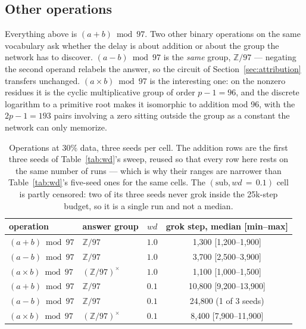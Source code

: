 \documentclass[11pt]{article}
\begin{document}
\subsection{Other operations}
\label{sec:ops}

Everything above is $(a+b) \bmod 97$. Two other binary operations on the same
vocabulary ask whether the delay is about addition or about the group the
network has to discover. $(a-b) \bmod 97$ is the \emph{same} group,
$\mathbb{Z}/97$ --- negating the second operand relabels the answer, so the
circuit of Section~\ref{sec:attribution} transfers unchanged.
$(a \times b) \bmod 97$ is the interesting one: on the nonzero residues it is
the cyclic multiplicative group of order $p - 1 = 96$, and the discrete
logarithm to a primitive root makes it isomorphic to addition mod 96, with the
$2p - 1 = 193$ pairs involving a zero sitting outside the group as a constant
the network can only memorize.

\begin{table}[h]
  \centering
  \caption{Operations at 30\% data, three seeds per cell. The addition rows
  are the first three seeds of Table~\ref{tab:wd}'s sweep, reused so that
  every row here rests on the same number of runs --- which is why their
  ranges are narrower than Table~\ref{tab:wd}'s five-seed ones for the same
  cells. The $(\text{sub}, wd\,{=}\,0.1)$ cell is partly censored: two of its
  three seeds never grok inside the 25k-step budget, so it is a single run and
  not a median.}
  \label{tab:ops}
  \begin{tabular}{llcc}
    \toprule
    operation & answer group & $wd$ & grok step, median [min--max] \\
    \midrule
    $(a+b) \bmod 97$      & $\mathbb{Z}/97$        & $1.0$ & 1{,}300 [1{,}200--1{,}900] \\
    $(a-b) \bmod 97$      & $\mathbb{Z}/97$        & $1.0$ & 3{,}700 [2{,}500--3{,}900] \\
    $(a\times b) \bmod 97$ & $(\mathbb{Z}/97)^{\times}$ & $1.0$ & 1{,}100 [1{,}000--1{,}500] \\
    $(a+b) \bmod 97$      & $\mathbb{Z}/97$        & $0.1$ & 10{,}800 [9{,}200--13{,}900] \\
    $(a-b) \bmod 97$      & $\mathbb{Z}/97$        & $0.1$ & 24{,}800 (1 of 3 seeds) \\
    $(a\times b) \bmod 97$ & $(\mathbb{Z}/97)^{\times}$ & $0.1$ & 8{,}400 [7{,}900--11{,}900] \\
    \bottomrule
  \end{tabular}
\end{table}
\end{document}
